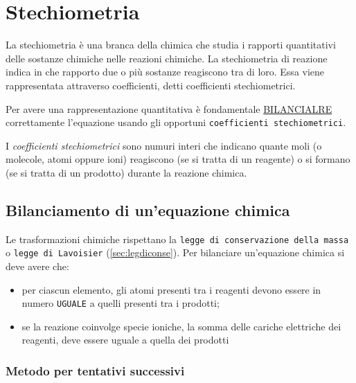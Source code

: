 \chapter{Stechiometria}
\label{chap:stechiometria}
\begin{defi}
  La stechiometria è una branca della chimica che studia i rapporti quantitativi delle sostanze chimiche nelle
  reazioni chimiche. La stechiometria di reazione indica in che rapporto due o più sostanze reagiscono tra di loro.
  Essa viene rappresentata attraverso coefficienti, detti coefficienti stechiometrici.
\end{defi}
Per avere una rappresentazione quantitativa è fondamentale \underline{BILANCIALRE} correttamente l'equazione usando
gli opportuni \texttt{coefficienti stechiometrici}.
\begin{center}
\end{center}
I \textit{\color{red} coefficienti stechiometrici} sono numuri interi che indicano quante moli (o molecole, atomi
oppure ioni) reagiscono (se si tratta di un reagente) o si formano (se si tratta di un prodotto) durante la reazione
chimica.

\section{Bilanciamento di un'equazione chimica}
\label{sec:bildiuneqchimica}

\begin{defi}
  Le trasformazioni chimiche rispettano la \texttt{legge di conservazione della massa} o
  \texttt{legge di Lavoisier} (\ref{sec:legdiconse}). Per bilanciare un'equazione chimica si deve
  avere che:
  \begin{itemize}
  \item per ciascun elemento, gli atomi presenti tra i reagenti devono essere in numero
    \texttt{UGUALE} a quelli presenti tra i prodotti;
  \item se la reazione coinvolge specie ioniche, la somma delle cariche elettriche dei reagenti,
    deve essere uguale a quella dei prodotti
  \end{itemize}
\end{defi}

\subsection{Metodo per tentativi successivi}
\label{sec:metpertentsucc}

